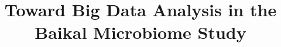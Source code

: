 \documentclass[conference,a4paper]{IEEEtran}
\begin{document}

%
\date{}
\title{Toward Big Data Analysis in the Baikal Microbiome Study}




%

\DeclareRobustCommand*{\IEEEauthorrefmark}[1]{\raisebox{0pt}[0pt][0pt]{\textsuperscript{\footnotesize #1}}}
\end{document}
